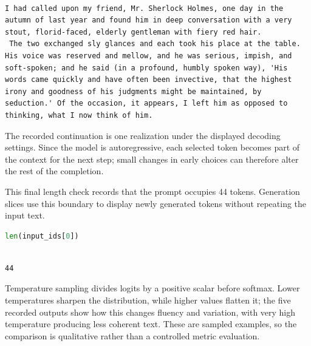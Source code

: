 \documentclass[../labs.tex]{subfiles}
\begin{document}
\hypertarget{out:lab03-gpt2-c13}{}\label{out:lab03-gpt2-c13}

\begin{lstlisting}[style=terminalOutput,breakatwhitespace=false,columns=fullflexible]

I had called upon my friend, Mr. Sherlock Holmes, one day in the autumn of last year and found him in deep conversation with a very stout, florid-faced, elderly gentleman with fiery red hair.
 The two exchanged sly glances and each took his place at the table. His voice was reserved and mellow, and he was serious, impish, and soft-spoken; and he said (in a profound, humbly spoken way), 'His words came quickly and have often been invective, that the highest irony and goodness of his judgments might be maintained, by seduction.' Of the occasion, it appears, I left him as opposed to thinking, what I now think of him.

\end{lstlisting}

The recorded continuation is one realization under the displayed decoding settings. Since the model is autoregressive, each selected token becomes part of the context for the next step; small changes in early choices can therefore alter the rest of the completion.


This final length check records that the prompt occupies 44 tokens. Generation slices use this boundary to display newly generated tokens without repeating the input text.


\begin{lstlisting}[language=Python,basicstyle=\ttfamily\scriptsize,breaklines=true,breakatwhitespace=false,columns=fullflexible,keepspaces=true,numbers=none]
len(input_ids[0])
\end{lstlisting}

\hypertarget{out:lab03-gpt2-c14}{}\label{out:lab03-gpt2-c14}

\begin{lstlisting}[style=terminalOutput,breakatwhitespace=false,columns=fullflexible]

44

\end{lstlisting}


Temperature sampling divides logits by a positive scalar before softmax. Lower temperatures sharpen the distribution, while higher values flatten it; the five recorded outputs show how this changes fluency and variation, with very high temperature producing less coherent text. These are sampled examples, so the comparison is qualitative rather than a controlled metric evaluation.
\end{document}
